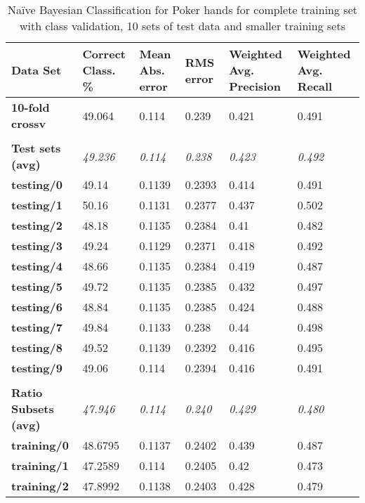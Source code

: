 \documentclass[10pt, a4paper]{article}
\begin{document}
\begin{table}[htbp]
  \centering
  \begin{tabular}{p{3cm}p{1.5cm}p{1.5cm}p{1.5cm}p{1.5cm}p{1.5cm}}
    \toprule
    \textbf{Data Set} & Correct Class. \% & Mean Abs. error & RMS error & Weighted Avg. Precision & Weighted Avg. Recall \\
    \midrule
    \textbf{10-fold crossv} & 49.064 & 0.114 & 0.239 & 0.421 & 0.491 \\
    \textbf{} &       &       &       &       &  \\
    \textbf{Test sets (avg)} & \textit{49.236} & \textit{0.114} & \textit{0.238} & \textit{0.423} & \textit{0.492} \\
    \textbf{   testing/0} & 49.14 & 0.1139 & 0.2393 & 0.414 & 0.491 \\
    \textbf{   testing/1} & 50.16 & 0.1131 & 0.2377 & 0.437 & 0.502 \\
    \textbf{   testing/2} & 48.18 & 0.1135 & 0.2384 & 0.41  & 0.482 \\
    \textbf{   testing/3} & 49.24 & 0.1129 & 0.2371 & 0.418 & 0.492 \\
    \textbf{   testing/4} & 48.66 & 0.1135 & 0.2384 & 0.419 & 0.487 \\
    \textbf{   testing/5} & 49.72 & 0.1135 & 0.2385 & 0.432 & 0.497 \\
    \textbf{   testing/6} & 48.84 & 0.1135 & 0.2385 & 0.424 & 0.488 \\
    \textbf{   testing/7} & 49.84 & 0.1133 & 0.238 & 0.44  & 0.498 \\
    \textbf{   testing/8} & 49.52 & 0.1139 & 0.2392 & 0.416 & 0.495 \\
    \textbf{   testing/9} & 49.06 & 0.114 & 0.2394 & 0.416 & 0.491 \\
    \textbf{} &       &       &       &       &  \\
    \textbf{Ratio Subsets (avg)} & \textit{47.946} & \textit{0.114} & \textit{0.240} & \textit{0.429} & \textit{0.480} \\
    \textbf{   training/0} & 48.6795 & 0.1137 & 0.2402 & 0.439 & 0.487 \\
    \textbf{   training/1} & 47.2589 & 0.114 & 0.2405 & 0.42  & 0.473 \\
    \textbf{   training/2} & 47.8992 & 0.1138 & 0.2403 & 0.428 & 0.479 \\
    \bottomrule
    \end{tabular}%


	\caption{Na\"ive Bayesian Classification for Poker hands for complete training set with class validation, 10 sets of test data and smaller training sets}   
  \label{tab:nbresults}%
\end{table}%
\end{document}
